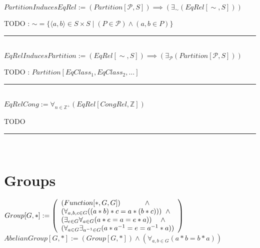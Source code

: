 \documentclass{book}
\newcommand{\abr}{:=}
\newcommand{\st}{\mathbin{|}}
\begin{document}
$PartitionInducesEqRel \abr (Partition[\mathcal{P}, S]) \implies (\exists_{\sim}(EqRel[\sim, S]))$
\begin{enumerate}
  \lit TODO : $\sim = \{\langle a, b \rangle \in S \times S \st (P \in \mathcal{P}) \land (a, b \in P)\}$
\end{enumerate} \vspace{.75mm} \hrule \vspace{.75mm} \ \\

$EqRelInducesPartition \abr (EqRel[\sim, S]) \implies (\exists_{\mathcal{P}}(Partition[\mathcal{P}, S]))$
\begin{enumerate}
  \lit TODO : $Partition[EqClass_1, EqClass_2, \ldots]$
\end{enumerate} \vspace{.75mm} \hrule \vspace{.75mm} \ \\

$EqRelCong \abr \forall_{n \in \mathbb{Z}^+}(EqRel[CongRel, \mathbb{Z}])$
\begin{enumerate}
  \lit TODO
\end{enumerate} \vspace{.75mm} \hrule \vspace{.75mm} \ \\


\section{Groups}
$Group[G, *] \abr \left(\begin{array}{ll}
  (Function[*, G, G]) \hfill \land \hfill \\ %
  (\forall_{a, b, c \in G}((a * b) * c = a * (b * c))) \hfill \land \hfill \\ %
  (\exists_{e \in G} \forall_{a \in G}(a * e = a = e * a)) \hfill \land \hfill \\ %
  (\forall_{a \in G} \exists_{a^{-1} \in G}(a * a^{-1} = e = a^{-1} * a))
\end{array}\right)$ \\
$AbelianGroup[G, *] \abr (Group[G, *]) \land (\forall_{a, b \in G}(a * b = b * a))$ \\
\end{document}
